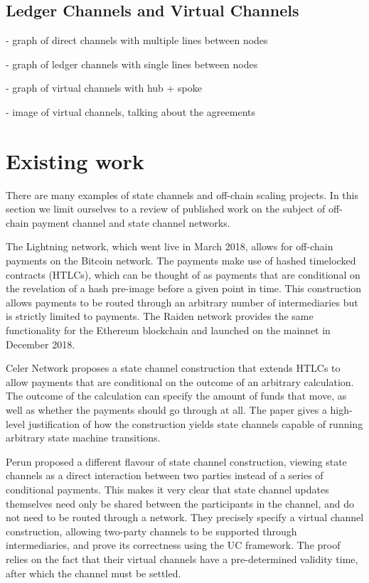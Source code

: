 \documentclass{article}
\begin{document}
\subsection{Ledger Channels and Virtual Channels}

- graph of direct channels with multiple lines between nodes

- graph of ledger channels with single lines between nodes

- graph of virtual channels with hub + spoke

- image of virtual channels, talking about the agreements




\section{Existing work}

There are many examples of state channels and off-chain scaling projects. In this section we limit ourselves to a review of published work on the subject of off-chain payment channel and state channel networks.

The Lightning network, which went live in March 2018, allows for off-chain payments on the Bitcoin network.
The payments make use of hashed timelocked contracts (HTLCs), which can be thought of as payments that are conditional on the revelation of a hash pre-image before a given point in time.
This construction allows payments to be routed through an arbitrary number of intermediaries but is strictly limited to payments.
The Raiden network provides the same functionality for the Ethereum blockchain and launched on the mainnet in December 2018.

Celer Network proposes a state channel construction that extends HTLCs to allow payments that are conditional on the outcome of an arbitrary calculation.
The outcome of the calculation can specify the amount of funds that move, as well as whether the payments should go through at all.
The paper gives a high-level justification of how the construction yields state channels capable of running arbitrary state machine transitions.

Perun proposed a different flavour of state channel construction, viewing state channels as a direct interaction between two parties instead of a series of conditional payments.
This makes it very clear that state channel updates themselves need only be shared between the participants in the channel, and do not need to be routed through a network.
They precisely specify a virtual channel construction, allowing two-party channels to be supported through intermediaries, and prove its correctness using the UC framework.
The proof relies on the fact that their virtual channels have a pre-determined validity time, after which the channel must be settled.
\end{document}
